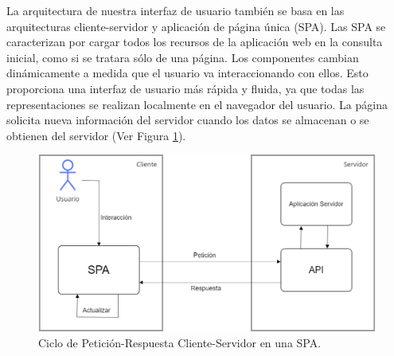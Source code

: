 La arquitectura de nuestra interfaz de usuario también se basa en las arquitecturas cliente-servidor y aplicación de página única (SPA). Las SPA se caracterizan por cargar todos los recursos de la aplicación web en la consulta inicial, como si se tratara sólo de una página. Los componentes cambian dinámicamente a medida que el usuario va interaccionando con ellos. Esto proporciona una interfaz de usuario más rápida y fluida, ya que todas las representaciones se realizan localmente en el navegador del usuario. La página solicita nueva información del servidor cuando los datos se almacenan o se obtienen del servidor (Ver Figura \ref{fig:spa}).

\begin{figure}[htbp]
\centering
\includegraphics[scale=0.4]{Graphics/mySPAt}
\caption{Ciclo de Petición-Respuesta Cliente-Servidor en una SPA.}
\label{fig:spa}
\end{figure}
 
%
%

